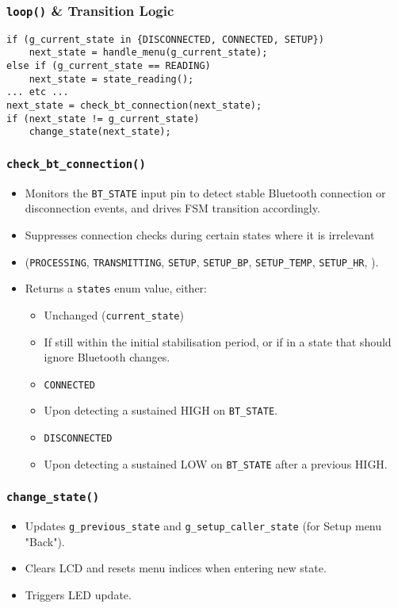 \subsubsection{\lstinline|loop()| \& Transition Logic}
\begin{lstlisting}
if (g_current_state in {DISCONNECTED, CONNECTED, SETUP})
	next_state = handle_menu(g_current_state);
else if (g_current_state == READING)
	next_state = state_reading();
... etc ...
next_state = check_bt_connection(next_state);
if (next_state != g_current_state)
	change_state(next_state);
\end{lstlisting}

\subsubsection{\lstinline|check_bt_connection()|}
\begin{itemize}
	\item Monitors the \lstinline|BT_STATE| input pin to detect stable Bluetooth connection or disconnection events, and drives FSM transition accordingly.
	\item Suppresses connection checks during certain states where it is irrelevant
	\item[] (\lstinline|PROCESSING|, \lstinline|TRANSMITTING|, \lstinline|SETUP|, \lstinline|SETUP_BP|, \lstinline|SETUP_TEMP|, \lstinline|SETUP_HR|, ).
	\item Returns a \lstinline|states| enum value, either:
	\begin{itemize}
		\item Unchanged (\lstinline|current_state|)
		\item[] If still within the initial stabilisation period, or if in a state that should ignore Bluetooth changes.
		\item \lstinline|CONNECTED|
		\item[] Upon detecting a sustained HIGH on \lstinline|BT_STATE|.
		\item \lstinline|DISCONNECTED|
		\item[] Upon detecting a sustained LOW on \lstinline|BT_STATE| after a previous HIGH.
	\end{itemize}
\end{itemize}

\subsubsection{\lstinline|change_state()|}
\begin{itemize}
	\item Updates \lstinline|g_previous_state| and \lstinline|g_setup_caller_state| (for Setup menu "Back").
	\item Clears LCD and resets menu indices when entering new state.
	\item Triggers LED update.
\end{itemize}

